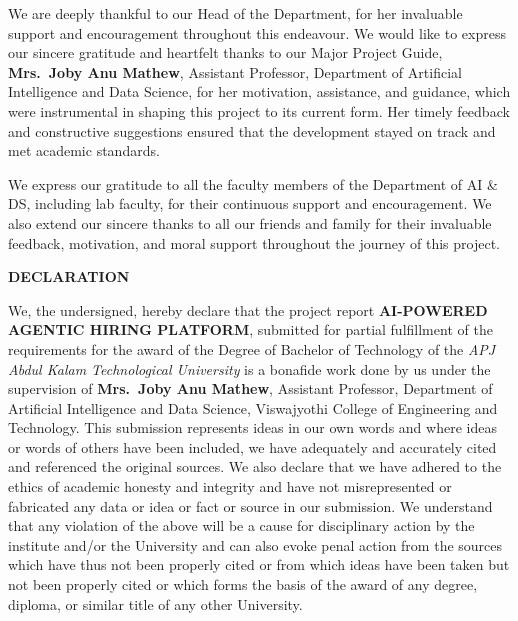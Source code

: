 \documentclass[12pt,a4paper]{report}
\begin{document}
We are deeply thankful to our Head of the Department, for her invaluable support and encouragement throughout this endeavour. We would like to express our sincere gratitude and heartfelt thanks to our Major Project Guide, \textbf{Mrs.\ Joby Anu Mathew}, Assistant Professor, Department of Artificial Intelligence and Data Science, for her motivation, assistance, and guidance, which were instrumental in shaping this project to its current form. Her timely feedback and constructive suggestions ensured that the development stayed on track and met academic standards.

We express our gratitude to all the faculty members of the Department of AI \& DS, including lab faculty, for their continuous support and encouragement. We also extend our sincere thanks to all our friends and family for their invaluable feedback, motivation, and moral support throughout the journey of this project.
\clearpage

\clearpage
\pagestyle{empty}
\begin{center}
    {\large\bfseries DECLARATION}
\end{center}
\vspace{0.5cm}

\noindent
We, the undersigned, hereby declare that the project report
\textbf{AI-POWERED AGENTIC HIRING PLATFORM},
submitted for partial fulfillment of the requirements for the award of the Degree of Bachelor
of Technology of the \textit{APJ Abdul Kalam Technological University} is a bonafide work done by us
under the supervision of \textbf{Mrs.\ Joby Anu Mathew}, Assistant Professor, Department of
Artificial Intelligence and Data Science, Viswajyothi College of Engineering and Technology.
This submission represents ideas in our own words and where ideas or words of others have been
included, we have adequately and accurately cited and referenced the original sources. We also
declare that we have adhered to the ethics of academic honesty and integrity and have not
misrepresented or fabricated any data or idea or fact or source in our submission. We understand
that any violation of the above will be a cause for disciplinary action by the institute and/or
the University and can also evoke penal action from the sources which have thus not been
properly cited or from which ideas have been taken but not been properly cited or which forms
the basis of the award of any degree, diploma, or similar title of any other University.
\end{document}
